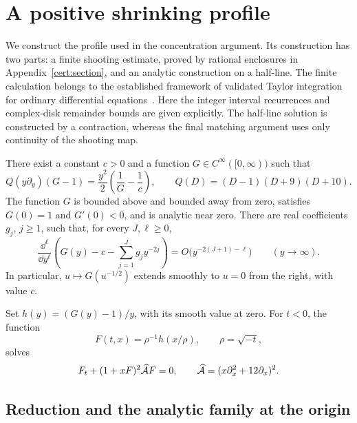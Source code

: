 \section{A positive shrinking profile}\label{prof:section}
\label{sec:profile}

We construct the profile used in the concentration argument.  Its construction
has two parts: a finite shooting estimate, proved by rational enclosures in
Appendix~\ref{cert:section}, and an analytic construction on a half-line.
The finite calculation belongs to the established framework of
validated Taylor integration for ordinary differential
equations~\cite{NedialkovJacksonCorliss1999}. Here the integer interval
recurrences and complex-disk remainder bounds are given explicitly.
The half-line solution is constructed by a contraction, whereas the
final matching argument uses only continuity of the shooting map.

\begin{theorem}\label{prof:profile}
There exist a constant $c>0$ and a function $G\in C^\infty([0,\infty))$
such that
\begin{equation}\label{prof:profile-equation}
 Q(y\partial_y)(G-1)=\frac{y^2}{2}\left(\frac1G-\frac1c\right),
 \qquad Q(D)=(D-1)(D+9)(D+10).
\end{equation}
The function $G$ is bounded above and bounded away from zero, satisfies
$G(0)=1$ and $G'(0)<0$, and is analytic near zero.  There are real
coefficients $g_j$, $j\ge1$, such that, for every $J,\ell\ge0$,
\begin{equation}\label{prof:expansion}
 \frac{\dd^\ell}{\dd y^\ell}
 \left(G(y)-c-\sum_{j=1}^{J}g_jy^{-2j}\right)
 =O\bigl(y^{-2(J+1)-\ell}\bigr)\qquad(y\longrightarrow\infty).
\end{equation}
In particular, $u\mapsto G(u^{-1/2})$ extends smoothly to $u=0$ from
the right, with value $c$.

Set $h(y)=(G(y)-1)/y$, with its smooth value at zero.  For $t<0$, the
function
\begin{equation}\label{prof:flat-shrinker}
 F(t,x)=\rho^{-1}h(x/\rho),\qquad \rho=\sqrt{-t},
\end{equation}
solves
\[
 F_t+(1+xF)^2\widehat{\mathcal A}F=0,
 \qquad \widehat{\mathcal A}=(x\partial_x^2+12\partial_x)^2.
\]
\end{theorem}

\subsection{Reduction and the analytic family at the origin}


